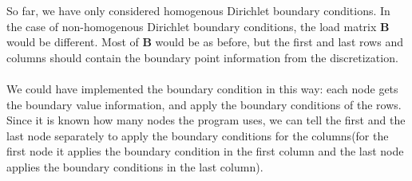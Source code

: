 So far, we have only considered homogenous Dirichlet boundary conditions. In the case of non-homogenous Dirichlet boundary conditions, the load matrix $\mathbf{B}$ would be different. Most of $\mathbf{B}$ would be as before, but the first and last rows and columns should contain the boundary point information from the discretization. \\
\\
We could have implemented the boundary condition in this way: each node gets the boundary value information, and apply the boundary conditions of the rows. Since it is known how many nodes the program uses, we can tell the first and the last node separately to apply the boundary conditions for the columns(for the first node it applies the boundary condition in the first column and the last node applies the boundary conditions in the last column).